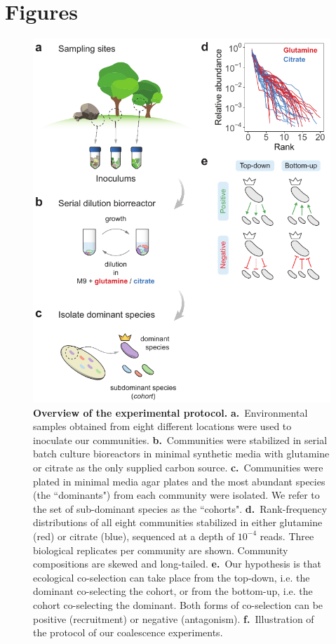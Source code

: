\documentclass[a4paper,10pt]{article}
\begin{document}
\clearpage

\clearpage

%


\clearpage

\section*{Figures}\label{figs}

\begin{figure}[!h]
\centering
\includegraphics[width=12cm,keepaspectratio]{figs/fig1.pdf}
\caption{\textbf{Overview of the experimental protocol.}
\textbf{a.}~Environmental samples obtained from eight different locations were used
to inoculate our communities.
\textbf{b.}~Communities were stabilized in serial batch culture bioreactors
\cite{Goldford2018} in minimal synthetic media with glutamine or citrate as the
only supplied carbon source.
\textbf{c.}~Communities were plated in minimal media agar plates and the most abundant
species (the ``dominants") from each community were isolated. We refer to the set of
sub-dominant species as the ``cohorts".
\textbf{d.}~Rank-frequency distributions of all eight communities stabilized in either
glutamine (red) or citrate (blue), sequenced at a depth of $10^{-4}$ reads.
Three biological replicates per community are shown.
Community compositions are skewed and long-tailed.
\textbf{e.}~Our hypothesis is that ecological co-selection can take place from the top-down,
i.e. the dominant co-selecting the cohort, or from the bottom-up, i.e. the cohort co-selecting
the dominant. Both forms of co-selection can be positive (recruitment) or negative
(antagonism).
\textbf{f.}~Illustration of the protocol of our coalescence experiments.}
\label{fig1}
\end{figure}

\clearpage
\end{document}
